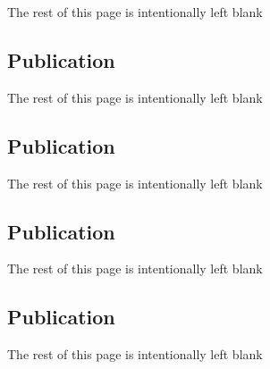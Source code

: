 \documentclass{article}
\def\lb{\vfill{The rest of this page is intentionally left blank}\vfill}
\begin{document}
 \lb 

\center \subsection{Publication} 
 \lb 

\center \subsection{Publication} 
 \lb 

\center \subsection{Publication} 
 \lb 

\center \subsection{Publication} 
 \lb 


\end{document}
